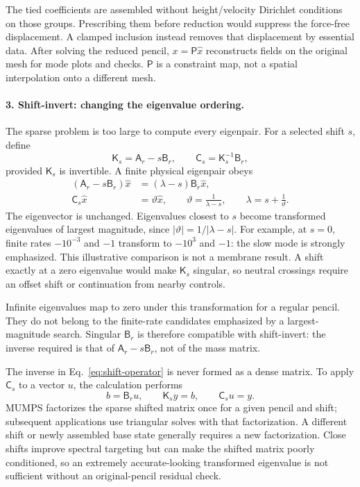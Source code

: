 The tied coefficients are assembled without height/velocity Dirichlet conditions on those groups. Prescribing them before reduction would suppress the force-free displacement. A clamped inclusion instead removes that displacement by essential data. After solving the reduced pencil, $x=\mathsf P\widehat x$ reconstructs fields on the original mesh for mode plots and checks. $\mathsf P$ is a constraint map, not a spatial interpolation onto a different mesh.

\paragraph{3. Shift-invert: changing the eigenvalue ordering.}
The sparse problem is too large to compute every eigenpair. For a selected shift $s$, define
\begin{equation}
\mathsf K_s=\mathsf A_r-s\mathsf B_r,\qquad
\mathsf C_s=\mathsf K_s^{-1}\mathsf B_r,
\label{eq:shift-operator}
\end{equation}
provided $\mathsf K_s$ is invertible. A finite physical eigenpair obeys
\begin{align}
(\mathsf A_r-s\mathsf B_r)\widehat x
&=(\lambda-s)\mathsf B_r\widehat x,\\
\mathsf C_s\widehat x&=\vartheta\widehat x,
\qquad \vartheta=\frac{1}{\lambda-s},
\qquad \lambda=s+\frac{1}{\vartheta}.
\label{eq:shift-mapping}
\end{align}
The eigenvector is unchanged. Eigenvalues closest to $s$ become transformed eigenvalues of largest magnitude, since $|\vartheta|=1/|\lambda-s|$. For example, at $s=0$, finite rates $-10^{-3}$ and $-1$ transform to $-10^3$ and $-1$: the slow mode is strongly emphasized. This illustrative comparison is not a membrane result. A shift exactly at a zero eigenvalue would make $\mathsf K_s$ singular, so neutral crossings require an offset shift or continuation from nearby controls.

Infinite eigenvalues map to zero under this transformation for a regular pencil. They do not belong to the finite-rate candidates emphasized by a largest-magnitude search. Singular $\mathsf B_r$ is therefore compatible with shift-invert: the inverse required is that of $\mathsf A_r-s\mathsf B_r$, not of the mass matrix.

The inverse in Eq.~\eqref{eq:shift-operator} is never formed as a dense matrix. To apply $\mathsf C_s$ to a vector $u$, the calculation performs
\begin{equation}
b=\mathsf B_ru,\qquad
\mathsf K_sy=b,\qquad
\mathsf C_su=y.
\label{eq:shift-application}
\end{equation}
MUMPS factorizes the sparse shifted matrix once for a given pencil and shift; subsequent applications use triangular solves with that factorization. A different shift or newly assembled base state generally requires a new factorization. Close shifts improve spectral targeting but can make the shifted matrix poorly conditioned, so an extremely accurate-looking transformed eigenvalue is not sufficient without an original-pencil residual check.

